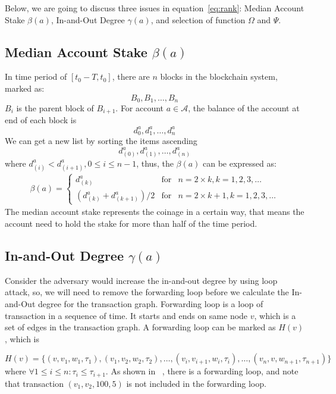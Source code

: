 Below, we are going to discuss three issues in equation~\ref{eq:rank}: Median Account Stake $\beta(a)$, In-and-Out Degree $\gamma(a)$, and selection of function $\Omega$ and $\Psi$.

\subsection{Median Account Stake $\beta(a)$}
In time period of $[t_0-T, t_0]$, there are $n$ blocks in the blockchain system, marked as:
\[
B_0, B_1, \dots, B_n
\]
\noindent $B_{i}$ is the parent block of $B_{i+1}$. For account $a \in \mathcal{A}$, the balance of the account at end of each block is
\[
d^a_0, d^a_1, \dots, d^a_n
\]
We can get a new list by sorting the items ascending 
\[
d^a_{(0)}, d^a_{(1)}, \dots, d^a_{(n)}
\]
where $d^a_{(i)} < d^a_{(i+1)}, 0\le i \le {n-1}$, thus, the $\beta(a)$ can be expressed as:
\begin{align}
\beta(a) = \left\{ \begin{array}{rcl}
{d^a_{(k)}} & \mbox{for} & n=2\times{}k, k=1, 2, 3, \ldots \\
{(d^a_{(k)} + d^a_{(k+1)})/2} & \mbox{for} & n=2\times{}k + 1, k=1, 2, 3, \ldots
\end{array}\right.
\end{align}
The median account stake represents the coinage in a certain way, that means the account need to hold the stake for more than half of the time period.

\subsection{In-and-Out Degree $\gamma(a)$}
Consider the adversary would increase the in-and-out degree by using loop attack, so, we will need to remove the forwarding loop before we calculate the In-and-Out degree for the transaction graph. Forwarding loop is a loop of transaction in a sequence of time.
It starts and ends on same node $v$, which is a set of edges in the transaction graph. A forwarding loop can be marked as $H(v)$, which is

\[
H(v) = \{(v, v_1, w_1, \tau_1), (v_1, v_2, w_2, \tau_2), \dots, (v_i, v_{i+1}, w_{i}, \tau_i), \dots, (v_n, v, w_{n+1}, \tau_{n+1})\}
\]
\noindent where $\forall 1\le i \le n : \tau_i \le \tau_{i+1} $.
\noindent As shown in ~, there is a forwarding loop, and note that transaction $(v_1, v_2, 100, 5)$ is not included in the forwarding loop.




